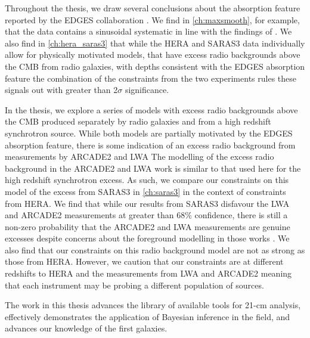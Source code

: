 Throughout the thesis, we draw several conclusions about the absorption feature reported by the EDGES collaboration \cite{Bowman_edges_2018}. We find in \cref{ch:maxsmooth}, for example, that the data contains a sinusoidal systematic in line with the findings of \cite{Hills2018, Singh_edges_2019, Bradley_EDGES_2019, Sims2020}. We also find in \cref{ch:hera_saras3} that while the HERA and SARAS3 data individually allow for physically motivated models, that have excess radio backgrounds above the CMB from radio galaxies, with depths consistent with the EDGES absorption feature the combination of the constraints from the two experiments rules these signals out with greater than 2$\sigma$ significance.

In the thesis, we explore a series of models with excess radio backgrounds above the CMB produced separately by radio galaxies and from a high redshift synchrotron source. While both models are partially motivated by the EDGES absorption feature, there is some indication of an excess radio background from measurements by ARCADE2 \cite{fixsen_arcade_2011} and LWA \cite{dowell_radio_2018} The modelling of the excess radio background in the ARCADE2 and LWA work is similar to that used here for the high redshift synchrotron excess. As such, we compare our constraints on this model of the excess from SARAS3 in \cref{ch:saras3} in the context of constraints from HERA. We find that while our results from SARAS3 disfavour the LWA and ARCADE2 measurements at greater than 68\% confidence, there is still a non-zero probability that the ARCADE2 and LWA measurements are genuine excesses despite concerns about the foreground modelling in those works \cite{Subrahmanyan2013}. We also find that our constraints on this radio background model are not as strong as those from HERA. However, we caution that our constraints are at different redshifts to HERA and the measurements from LWA and ARCADE2 meaning that each instrument may be probing a different population of sources.

The work in this thesis advances the library of available tools for 21-cm analysis, effectively demonstrates the application of Bayesian inference in the field, and advances our knowledge of the first galaxies.